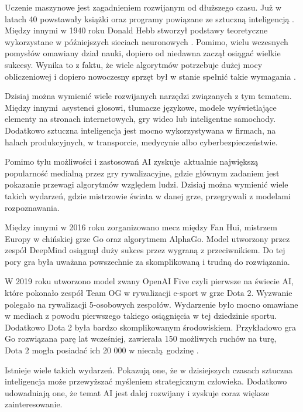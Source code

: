 \documentclass[12pt,oneside,a4paper]{report}
\begin{document}
Uczenie maszynowe jest zagadnieniem rozwijanym od dłuższego czasu.
Już w latach 40 powstawały książki oraz programy powiązane ze sztuczną inteligencją \cite{hist AI}. 
Między innymi w 1940 roku Donald Hebb stworzył podstawy teoretyczne wykorzystane w 
późniejszych sieciach neuronowych \cite{hist AI}. Pomimo, wielu wczesnych pomysłów omawiany dział
nauki,
dopiero od niedawna zaczął osiągać wielkie sukcesy. Wynika to z faktu, że wiele algorytmów
potrzebuje
dużej mocy obliczeniowej  
i dopiero nowoczesny sprzęt był w stanie spełnić takie wymagania \cite{hist AI}.

Dzisiaj można wymienić wiele rozwijanych narzędzi związanych z tym tematem.
Między innymi asystenci głosowi, tłumacze językowe, modele wyświetlające elementy na
stronach internetowych, gry wideo lub inteligentne samochody.
Dodatkowo sztuczna inteligencja jest mocno wykorzystywana w firmach,
na halach produkcyjnych, w transporcie, medycynie albo cyberbezpieczeństwie. 


Pomimo tylu możliwości i zastosowań AI zyskuje aktualnie największą 
popularność
medialną przez gry rywalizacyjne, gdzie głównym zadaniem jest pokazanie przewagi 
algorytmów względem
ludzi. Dzisiaj można wymienić wiele takich wydarzeń, gdzie 
mistrzowie świata w danej grze, przegrywali z modelami rozpoznawania. 


Między innymi w 2016 roku zorganizowano
mecz między Fan Hui, mistrzem Europy w chińskiej grze $\text{Go}$ oraz algorytmem
$\text{AlphaGo}$.
Model utworzony przez zespół $\text{DeepMind}$ osiągnął duży sukces przez wygraną z przeciwnikiem.
Do tej pory gra była uważana powszechnie za skomplikowaną i trudną do rozwiązania.

W 2019 roku utworzono model zwany $\text{OpenAI Five}$ czyli pierwsze na świecie AI, które pokonało
zespół Team OG w rywalizacji $\text{e-sport}$ w grze $\text{Dota 2}$. Wyzwanie polegało
na rywalizacji 5-osobowych
zespołów.
Wydarzenie było mocno omawiane w mediach z powodu pierwszego takiego osiągnięcia w tej dziedzinie
sportu. 
Dodatkowo Dota 2 była bardzo skomplikowanym środowiskiem.
Przykładowo gra $\text{Go}$ rozwiązana parę lat wcześniej, zawierała 150 możliwych ruchów na turę, 
$\text{Dota 2}$
mogła posiadać ich 20 000 w niecałą godzinę \cite{Dota2}.


Istnieje wiele takich wydarzeń. Pokazują one, że w dzisiejszych 
czasach sztuczna inteligencja może przewyższać myśleniem strategicznym człowieka. Dodatkowo 
udowadniają one, że
temat AI jest dalej rozwijany i zyskuje coraz większe zainteresowanie.   
\end{document}
